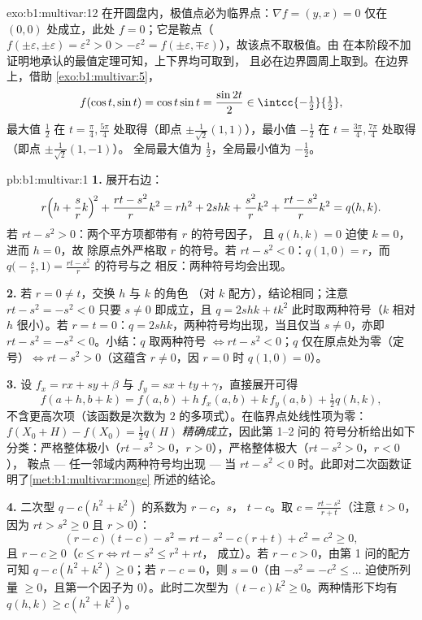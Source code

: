 \begin{solution}{exo:b1:multivar:12}
在开圆盘内，极值点必为临界点：$\nabla f = (y,
x) = 0$ 仅在 $(0,0)$ 处成立，此处 $f = 0$；它是鞍点（$f(\pm
\varepsilon, \pm\varepsilon) = \varepsilon^2 > 0 > -\varepsilon^2
= f(\pm\varepsilon, \mp\varepsilon)$），故该点不取极值。由
在本阶段不加证明地承认的最值定理可知，上下界均可取到，
且必在边界圆周上取到。在边界上，借助
\cref{exo:b1:multivar:5}，
\[
f(\cos t, \sin t) = \cos t\sin t = \frac{\sin 2t}{2}
\in \intcc{-\tfrac12}{\tfrac12},
\]
最大值 $\frac12$ 在 $t = \frac\pi4, \frac{5\pi}4$ 处取得（即点
$\pm\frac{1}{\sqrt2}(1,1)$），最小值 $-\frac12$ 在 $t =
\frac{3\pi}4, \frac{7\pi}4$ 处取得（即点 $\pm\frac{1}{\sqrt2}(1,-1)$）。
全局最大值为 $\frac12$，全局最小值为 $-\frac12$。
\end{solution}

\begin{solution}{pb:b1:multivar:1}
\textbf{1.} 展开右边：
\[
r\Bigl(h + \frac srk\Bigr)^{\!2} + \frac{rt - s^2}{r}k^2
= rh^2 + 2shk + \frac{s^2}{r}k^2 + \frac{rt - s^2}{r}k^2
= q(h,k) .
\]
若 $rt - s^2 > 0$：两个平方项都带有 $r$ 的符号因子，
且 $q(h,k) = 0$ 迫使 $k = 0$，进而 $h = 0$，故
除原点外严格取 $r$ 的符号。若 $rt - s^2 < 0$：$q(1, 0) = r$，而
$q\bigl(-\frac sr, 1\bigr) = \frac{rt - s^2}{r}$ 的符号与之
相反：两种符号均会出现。

\textbf{2.} 若 $r = 0 \neq t$，交换 $h$ 与 $k$ 的角色
（对 $k$ 配方），结论相同；注意
$rt - s^2 = -s^2 < 0$ 只要 $s \neq 0$ 即成立，且 $q =
2shk + tk^2$ 此时取两种符号（$k$ 相对 $h$ 很小）。若
$r = t = 0$：$q = 2shk$，两种符号均出现，当且仅当 $s \neq 0$，亦即
$rt - s^2 = -s^2 < 0$。小结：$q$ 取两种符号 $\iff rt -
s^2 < 0$；$q$ 仅在原点处为零（定号）$\iff rt -
s^2 > 0$（这蕴含 $r \neq 0$，因 $r = 0$ 时 $q(1,0) =
0$）。

\textbf{3.} 设 $f_x = rx + sy + \beta$ 与 $f_y = sx + ty +
\gamma$，直接展开可得
\[
f(a + h, b + k) = f(a, b) + h\,f_x(a,b) + k\,f_y(a,b)
+ \tfrac12 q(h, k),
\]
不含更高次项（该函数是次数为
$2$ 的多项式）。在临界点处线性项为零：$f(X_0 + H)
- f(X_0) = \frac12 q(H)$ \emph{精确成立}，因此第 1--2 问的
符号分析给出如下分类：严格整体极小（$rt - s^2 >
0$，$r > 0$），严格整体极大（$rt - s^2 > 0$，$r < 0$），
鞍点 --- 任一邻域内两种符号均出现 --- 当 $rt - s^2 <
0$ 时。此即对二次函数证明了\cref{met:b1:multivar:monge}
所述的结论。

\textbf{4.} 二次型 $q - c(h^2 + k^2)$ 的系数为 $r - c$，$s$，
$t - c$。取 $c = \frac{rt - s^2}{r + t}$（注意 $t > 0$，因为
$rt > s^2 \geq 0$ 且 $r > 0$）：
\[
(r - c)(t - c) - s^2 = rt - s^2 - c(r + t) + c^2 = c^2 \geq 0,
\]
且 $r - c \geq 0$（$c \leq r \iff rt - s^2 \leq r^2 + rt$，
成立）。若 $r - c > 0$，由第 1 问的配方可知
$q - c(h^2 + k^2) \geq 0$；若 $r - c = 0$，则 $s = 0$（由
$-s^2 = -c^2 \leq \dots$ 迫使所列量
$\geq 0$，且第一个因子为 $0$）。此时二次型为 $(t - c)k^2 \geq
0$。两种情形下均有 $q(h,k) \geq c(h^2 + k^2)$。


\end{solution}
